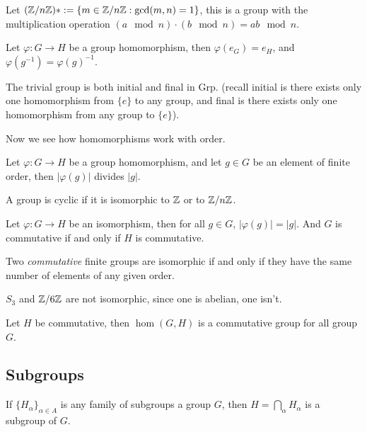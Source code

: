 \begin{defn}
    Let $(\mathbb{Z}/n\mathbb{Z})*:=\{m\in\mathbb{Z}/n\mathbb{Z}: \gcd(m,n)=1\}$, this is a group with the multiplication operation $(a\mod n)\cdot (b\mod n)=ab\mod n$.
\end{defn}
\begin{prop}
    Let $\varphi:G\to H$ be a group homomorphism, then $\varphi(e_G)=e_H$, and $\varphi(g^{-1})=\varphi(g)^{-1}$.
\end{prop}
\begin{prop}
    The trivial group is both initial and final in Grp. (recall initial is there exists only one homomorphism from $\{e\}$ to any group, and final is there exists only one homomorphism from any group to $\{e\}$).
\end{prop}
Now we see how homomorphisms work with order.

\begin{prop}
    Let $\varphi: G\to H$ be a group homomorphism, and let $g\in G$ be an element of finite order, then $|\varphi(g)|$ divides $|g|$.
\end{prop}
\begin{defn}[cyclic]
    A group is cyclic if it is isomorphic to $\mathbb{Z}$ or to $\mathbb{Z}/n\mathbb{Z}$.
\end{defn}
\begin{prop}
    Let $\varphi:G\to H$ be an isomorphism, then for all $g\in G$, $|\varphi(g)|=|g|$. And $G$ is commutative if and only if $H$ is commutative.
\end{prop}
\begin{thm}
    Two \textit{commutative} finite groups are isomorphic if and only if they have the same number of elements of any given order.
\end{thm}
\begin{example}
    $S_3$ and $\mathbb{Z}/6\mathbb{Z}$ are not isomorphic, since one is abelian, one isn't.
\end{example}
\begin{defn}
    Let $H$ be commutative, then $\hom(G,H)$ is a commutative group for all group $G$.
\end{defn}


\subsection{Subgroups}
\begin{prop}
    If $\{H_\alpha\}_{\alpha\in A}$ is any family of subgroups a group $G$, then $H=\bigcap_{\alpha}H_\alpha$ is a subgroup of $G$.
\end{prop}


